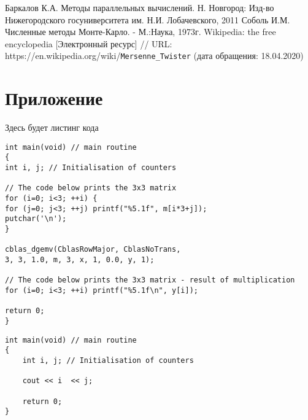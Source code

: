 \documentclass{report}
\begin{document}
\newpage

\begin{thebibliography}{1}
 Баркалов К.А. Методы параллельных вычислений. Н. Новгород: Изд-во Нижегородского госуниверситета им. Н.И. Лобачевского, 2011
 Соболь И.М. Численные методы Монте-Карло. - М.:Наука, 1973г.
 Wikipedia: the free encyclopedia [Электронный ресурс] // URL: https://en.wikipedia.org/wiki/\verb|Mersenne_Twister| (дата обращения: 18.04.2020)
\end{thebibliography}
\newpage

\section*{Приложение}
Здесь будет листинг кода

\begin{lstlisting}[label=testl,caption=Test]
int main(void) // main routine
{
int i, j; // Initialisation of counters

// The code below prints the 3x3 matrix
for (i=0; i<3; ++i) {
for (j=0; j<3; ++j) printf("%5.1f", m[i*3+j]);
putchar('\n');
}

cblas_dgemv(CblasRowMajor, CblasNoTrans,
3, 3, 1.0, m, 3, x, 1, 0.0, y, 1);

// The code below prints the 3x3 matrix - result of multiplication
for (i=0; i<3; ++i) printf("%5.1f\n", y[i]);

return 0;
}
\end{lstlisting}

\begin{lstlisting}[label=test2,caption=Test2]
int main(void) // main routine
{
	int i, j; // Initialisation of counters

	cout << i  << j;

	return 0;
}
\end{lstlisting}
\end{document}
